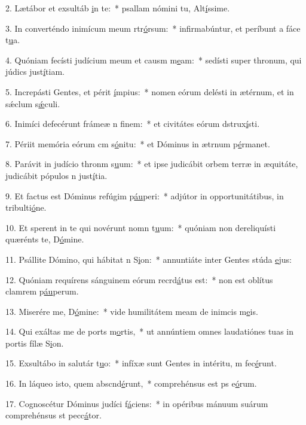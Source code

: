 2. Lætábor et exsultáb \uline{i}n te:~* psallam nómini tu, Alt\uline{í}ssime.\par 
3. In converténdo inimícum meum rtr\uline{ó}rsum:~* infirmabúntur, et períbunt a fáce t\uline{u}a.\par 
4. Quóniam fecísti judícium meum et causm m\uline{e}am:~* sedísti super thronum, qui júdics just\uline{í}tiam.\par 
5. Increpásti Gentes, et périt \uline{í}mpius:~* nomen eórum delésti in ætérnum, et in sǽclum s\uline{ǽ}culi.\par 
6. Inimíci defecérunt frámeæ n f\uline{i}nem:~* et civitátes eórum dstrux\uline{í}sti.\par 
7. Périit memória eórum cm s\uline{ó}nitu:~* et Dóminus in ætrnum p\uline{é}rmanet.\par 
8. Parávit in judício thronm s\uline{u}um:~* et ipse judicábit orbem terræ in æquitáte, judicábit pópulos n just\uline{í}tia.\par 
9. Et factus est Dóminus refúgim p\uline{áu}peri:~* adjútor in opportunitátibus, in tribulti\uline{ó}ne.\par 
10. Et sperent in te qui novérunt nomn t\uline{u}um:~* quóniam non dereliquísti quærénts te, D\uline{ó}mine.\par 
11. Psállite Dómino, qui hábitat n S\uline{i}on:~* annuntiáte inter Gentes stúda \uline{e}jus:\par 
12. Quóniam requírens sánguinem eórum recrd\uline{á}tus est:~* non est oblítus clamrem p\uline{áu}perum.\par 
13. Miserére me, D\uline{ó}mine:~* vide humilitátem meam de inimcis m\uline{e}is.\par 
14. Qui exáltas me de ports m\uline{o}rtis,~* ut annúntiem omnes laudatiónes tuas in portis fílæ S\uline{i}on.\par 
15. Exsultábo in salutár t\uline{u}o:~* infíxæ sunt Gentes in intéritu, m fec\uline{é}runt.\par 
16. In láqueo isto, quem abscnd\uline{é}runt,~* comprehénsus est ps e\uline{ó}rum.\par 
17. Cognoscétur Dóminus judíci f\uline{á}ciens:~* in opéribus mánuum suárum comprehénsus st pecc\uline{á}tor.\par 
